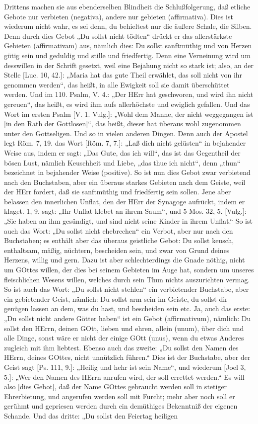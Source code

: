 Drittens machen sie aus ebenderselben Blindheit die Schlußfolgerung, daß etliche Gebote nur verbieten (negativa), andere nur gebieten (affirmativa). Dies ist wiederum nicht wahr, es sei denn, du behieltest nur die äußere Schale, die Silben. Denn durch dies Gebot „Du sollst nicht tödten“ drückt er das allerstärkste Gebieten (affirmativam) aus, nämlich dies: Du sollst sanftmüthig und von Herzen gütig sein und geduldig und stille und friedfertig. Denn eine Verneinung wird um desswillen in der Schrift gesetzt, weil eine Bejahung nicht so stark ist; also, an der Stelle [Luc. 10, 42.]: „Maria hat das gute Theil erwählet, das soll nicht von ihr genommen werden“, das heißt, in alle Ewigkeit soll sie damit überschüttet werden. Und im 110. Psalm, V. 4.: „Der HErr hat geschworen, und wird ihn nicht gereuen“, das heißt, es wird ihm aufs allerhöchste und ewiglich gefallen. Und das Wort im ersten Psalm [V. 1. Vulg.]: „Wohl dem Manne, der nicht weggegangen ist [in den Rath der Gottlosen]“, das heißt, dieser hat überaus wohl zugenommen unter den Gottseligen. Und so in vielen anderen Dingen. Denn auch der Apostel legt Röm. 7, 19. das Wort [Röm. 7, 7.]: „Laß dich nicht gelüsten“ in bejahender Weise aus, indem er sagt: „Das Gute, das ich will“, das ist das Gegentheil der bösen Lust, nämlich Keuschheit und Liebe, „das thue ich nicht“, denn „thun“ bezeichnet in bejahender Weise (positive). So ist nun dies Gebot zwar verbietend nach den Buchstaben, aber ein überaus starkes Gebieten nach dem Geiste, weil der HErr fordert, daß sie sanftmüthig und friedfertig sein sollen. Jene aber belassen den innerlichen Unflat, den der HErr der Synagoge aufrückt, indem er klaget. 1, 9. sagt: „Ihr Unflat klebet an ihrem Saum“, und 5 Mos. 32, 5. [Vulg.]: „Sie haben an ihm gesündigt, und sind nicht seine Kinder in ihrem Unflat.“ So ist auch das Wort: „Du sollst nicht ehebrechen“ ein Verbot, aber nur nach den Buchstaben; es enthält aber das überaus geistliche Gebot: Du sollst keusch, enthaltsam, mäßig, nüchtern, bescheiden sein, und zwar von Grund deines Herzens, willig und gern. Dazu ist aber schlechterdings die Gnade nöthig, nicht um GOttes willen, der dies bei seinem Gebieten im Auge hat, sondern um unseres fleischlichen Wesens willen, welches durch sein Thun nichts auszurichten vermag. So ist auch das Wort: „Du sollst nicht stehlen“ ein verbietender Buchstabe, aber ein gebietender Geist, nämlich: Du sollst arm sein im Geiste, du sollst dir genügen lassen an dem, was du hast, und bescheiden sein etc. Ja, auch das erste: „Du sollst nicht andere Götter haben“ ist ein Gebot (affirmativum), nämlich: Du sollst den HErrn, deinen GOtt, lieben und ehren, allein (unum), über dich und alle Dinge, sonst wäre er nicht der einige GOtt (unus), wenn du etwas Anderes zugleich mit ihm liebtest. Ebenso auch das zweite: „Du sollst den Namen des HErrn, deines GOttes, nicht unnützlich führen.“ Dies ist der Buchstabe, aber der Geist sagt [Ps. 111, 9.]: „Heilig und hehr ist sein Name“, und wiederum [Joel 3, 5.]: „Wer den Namen des HErrn anrufen wird, der soll errettet werden.“ Es will also [dies Gebot], daß der Name GOttes gebraucht werden soll in stetiger Ehrerbietung, und angerufen werden soll mit Furcht; mehr aber noch soll er gerühmt und gepriesen werden durch ein demüthiges Bekenntniß der eigenen Schande. Und das dritte: „Du sollst den Feiertag heiligen
